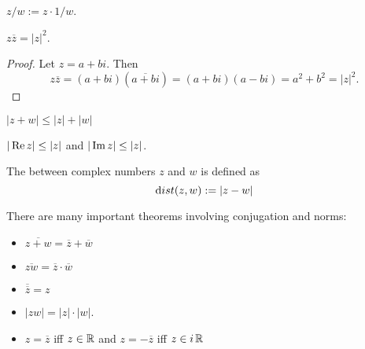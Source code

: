 \documentclass[notes]{subfiles}
\begin{document}
\begin{definition}
    $z/w := z \cdot 1/w$.
\end{definition}

\begin{theorem}
    $z\overline{z} = |z|^2$.
\end{theorem}
\begin{proof}
    Let $z = a+bi$.  Then
    \[ z\overline{z} = (a+bi)(\overline{a+bi}) = (a+bi)(a-bi)
    = a^2 + b^2 = |z|^2. \]
\end{proof}

\begin{theorem}
$    |z + w| \le |z| + |w|$
\end{theorem}

\begin{cor}
    $|\operatorname{Re}{z}| \le |z|$ and $|\operatorname{Im}{z}| \le |z|$.
\end{cor}

\begin{definition}
    The  between complex numbers $z$ and $w$ is defined as
    \[ {\text dist}(z,w) := |z - w| \]
\end{definition}

\noindent
There are many important theorems involving conjugation and norms:
\begin{itemize}
    \item $\overline{z+w} = \overline{z} + \overline{w}$

    \item $\overline{zw} = \overline{z} \cdot \overline{w}$

    \item $\overline{\overline{z}} = z$

    \item $|zw| = |z| \cdot |w|$.

    \item $z = \overline{z}$ iff $z \in \operatorname{\mathbb{R}}$ and $z = -\overline{z}$ iff $z \in i\operatorname{\mathbb{R}}$
\end{itemize}
\end{document}
